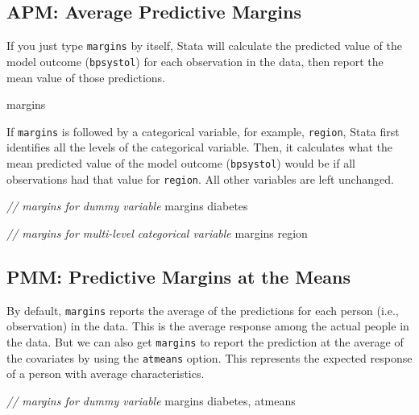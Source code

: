\documentclass[
]{book}
\newenvironment{Shaded}{\begin{snugshade}}{\end{snugshade}}
\newcommand{\CommentTok}[1]{\textcolor[rgb]{0.56,0.35,0.01}{\textit{#1}}}
\newcommand{\NormalTok}[1]{#1}
\begin{document}
\hypertarget{apm-average-predictive-margins}{%
\subsection{APM: Average Predictive Margins}\label{apm-average-predictive-margins}}

If you just type \texttt{margins} by itself, Stata will calculate the predicted value of the model outcome (\texttt{bpsystol}) for each observation in the data, then report the mean value of those predictions.

\begin{Shaded}
\begin{Highlighting}[]
\NormalTok{margins}
\end{Highlighting}
\end{Shaded}

If \texttt{margins} is followed by a categorical variable, for example, \texttt{region}, Stata first identifies all the levels of the categorical variable. Then, it calculates what the mean predicted value of the model outcome (\texttt{bpsystol}) would be if all observations had that value for \texttt{region}. All other variables are left unchanged.

\begin{Shaded}
\begin{Highlighting}[]
\CommentTok{// margins for dummy variable }
\NormalTok{margins diabetes}

\CommentTok{// margins for multi{-}level categorical variable }
\NormalTok{margins region}
\end{Highlighting}
\end{Shaded}

\hypertarget{pmm-predictive-margins-at-the-means}{%
\subsection{PMM: Predictive Margins at the Means}\label{pmm-predictive-margins-at-the-means}}

By default, \texttt{margins} reports the average of the predictions for each person (i.e., observation) in the data. This is the average response among the actual people in the data. But we can also get \texttt{margins} to report the prediction at the average of the covariates by using the \texttt{atmeans} option. This represents the expected response of a person with average characteristics.

\begin{Shaded}
\begin{Highlighting}[]
\CommentTok{// margins for dummy variable }
\NormalTok{margins diabetes, atmeans}
\end{Highlighting}
\end{Shaded}
\end{document}

